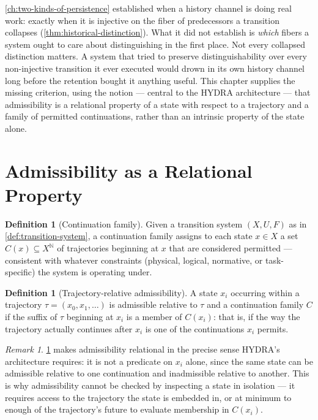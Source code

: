 \documentclass[11pt]{book}
\theoremstyle{plain}
\theoremstyle{definition}
\newtheorem{definition}[theorem]{Definition}
\theoremstyle{remark}
\newtheorem{remark}[theorem]{Remark}
\begin{document}
\cref{ch:two-kinds-of-persistence} established when a history channel
is doing real work: exactly when it is injective on the fiber of
predecessors a transition collapses (\cref{thm:historical-distinction}).
What it did not establish is \emph{which} fibers a system ought to
care about distinguishing in the first place. Not every collapsed
distinction matters. A system that tried to preserve distinguishability
over every non-injective transition it ever executed would drown in
its own history channel long before the retention bought it anything
useful. This chapter supplies the missing criterion, using the notion
--- central to the HYDRA architecture --- that admissibility is a
relational property of a state with respect to a trajectory and a
family of permitted continuations, rather than an intrinsic property
of the state alone.

\section{Admissibility as a Relational Property}

\begin{definition}[Continuation family]
\label{def:continuation-family}
Given a transition system $(X, U, F)$ as in
\cref{def:transition-system}, a continuation family assigns to each
state $x \in X$ a set $C(x) \subseteq X^{\mathbb{N}}$ of trajectories
beginning at $x$ that are considered permitted --- consistent with
whatever constraints (physical, logical, normative, or task-specific)
the system is operating under.
\end{definition}

\begin{definition}[Trajectory-relative admissibility]
\label{def:admissibility}
A state $x_i$ occurring within a trajectory $\tau = (x_0, x_1, \dots)$
is admissible relative to $\tau$ and a continuation family $C$ if the
suffix of $\tau$ beginning at $x_i$ is a member of $C(x_i)$: that is,
if the way the trajectory actually continues after $x_i$ is one of the
continuations $x_i$ permits.
\end{definition}

\begin{remark}
\cref{def:admissibility} makes admissibility relational in the precise
sense HYDRA's architecture requires: it is not a predicate on $x_i$
alone, since the same state can be admissible relative to one
continuation and inadmissible relative to another. This is why
admissibility cannot be checked by inspecting a state in isolation ---
it requires access to the trajectory the state is embedded in, or at
minimum to enough of the trajectory's future to evaluate membership in
$C(x_i)$.
\end{remark}
\end{document}
